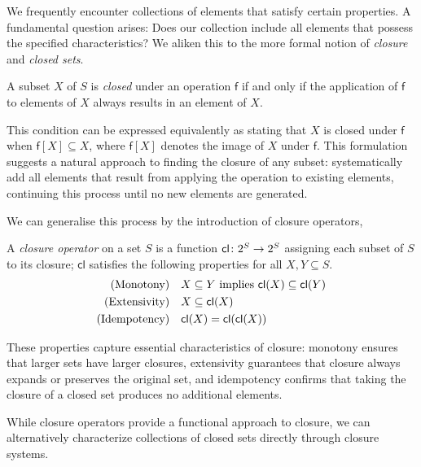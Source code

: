 We frequently encounter collections of elements that satisfy certain properties. A fundamental question arises: Does our collection include all elements that possess the specified characteristics? We aliken this to the more formal notion of \textit{closure} and \textit{closed sets}.

\begin{definition}
\label{definition:closed-set}
	A subset $X$ of $S$ is \textit{closed} under an operation $\mathsf{f}$ if and only if the application of $\mathsf{f}$ to elements of $X$ always results in an element of $X$.
\end{definition}

This condition can be expressed equivalently as stating that $X$ is closed under $\mathsf{f}$ when $\mathsf{f}[X] \subseteq X$, where $\mathsf{f}[X]$ denotes the image of $X$ under $\mathsf{f}$. This formulation suggests a natural approach to finding the closure of any subset: systematically add all elements that result from applying the operation to existing elements, continuing this process until no new elements are generated.

We can generalise this process by the introduction of closure operators,

\begin{definition}
\label{definition:closure-operator}
	A \emph{closure operator} on a set $S$ is a function $\mathsf{cl} \colon 2^{S} \to 2^{S}$ assigning each subset of $S$ to its closure; $\mathsf{cl}$ satisfies the following properties for all $X,Y \subseteq S$.
	\vspace{-1em}
	\begin{align}
    \text{(Monotony)} \quad & X \subseteq Y \text{ implies } \mathsf{cl}(X) \subseteq \mathsf{cl} (Y) \\
    \text{(Extensivity)} \quad & X \subseteq \mathsf{cl} (X) \\
    \text{(Idempotency)} \quad & \mathsf{cl} (X) = \mathsf{cl}(\mathsf{cl}(X))
    \vspace{-1em}
  \end{align}
\end{definition}

These properties capture essential characteristics of closure: monotony ensures that larger sets have larger closures, extensivity guarantees that closure always expands or preserves the original set, and idempotency confirms that taking the closure of a closed set produces no additional elements.

While closure operators provide a functional approach to closure, we can alternatively characterize collections of closed sets directly through closure systems.

